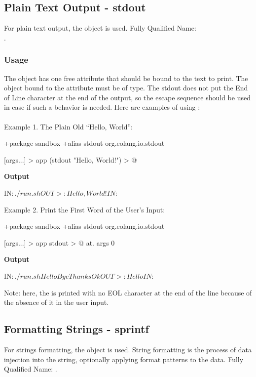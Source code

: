 \documentclass[12pt]{book}
\begin{document}
{{{\subsection{Plain Text Output - stdout} \label{subsec:stdout}
For plain text output, the  object is used.
Fully Qualified Name: 
\\
.

\subsubsection{Usage}
The  object has one free attribute  that should be bound to the text to print.
The object bound to the  attribute must be of  type.
The stdout does not put the End of Line character at the end of the output, so the \ff{\n} escape sequence should be used in case if such a behavior is needed. Here are examples of using :
\\
\\
Example 1. The Plain Old “Hello, World”:
\begin{ffcode}
+package sandbox
+alias stdout org.eolang.io.stdout

[args...] > app
  (stdout "Hello, World!\n") > @
\end{ffcode}
\textbf{Output}
\begin{ffcode}
IN$: ./run.sh
OUT>: Hello, World!
IN$: 
\end{ffcode}
Example 2. Print the First Word of the User's Input:
\begin{ffcode}
+package sandbox
+alias stdout org.eolang.io.stdout

[args...] > app
  stdout > @
    at.
      args
      0
\end{ffcode}
\textbf{Output}
\begin{ffcode}
IN$: ./run.sh Hello Bye Thanks Ok
OUT>: HelloIN$: 
\end{ffcode}

Note: here, the  is printed with no EOL character at the end of the line because of the absence of it in the user input.

\subsection{Formatting Strings - sprintf} \label{subsec:sprintf}
For strings formatting, the  object is used.
String formatting is the process of data injection into the string, optionally applying format patterns to the data.
Fully Qualified Name: .

}}}
\end{document}
